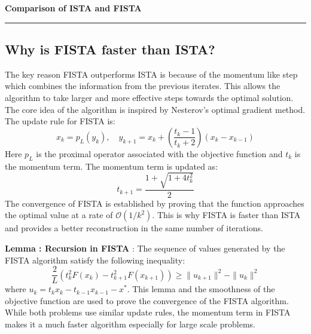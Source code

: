 \documentclass[a4paper,12pt]{article}
\newenvironment{solution}[2][]{%
    \begin{mdframed}[linecolor=blue!70!black, linewidth=2pt, roundcorner=10pt, backgroundcolor=yellow!10!white, skipabove=12pt, skipbelow=12pt]%
        \textbf{\large #2}
        \par\noindent\rule{\textwidth}{0.4pt}
}{
    \end{mdframed}
}
\begin{document}
\begin{solution}{Comparison of ISTA and FISTA}
  \subsection{Why is FISTA faster than ISTA?}
  The key reason FISTA outperforms ISTA is because of the momentum like step which combines the information from the previous iterates. This allows the algorithm to take larger and more effective steps towards the optimal solution. The core idea of the algorithm is inspired by Nesterov's optimal gradient method. The update rule for FISTA is:
  \begin{equation}
    x_k = p_L(y_k), \quad y_{k + 1} = x_k + \left( \displaystyle\frac{t_k - 1}{t_k + 2}\right) (x_k - x_{k-1})
  \end{equation}
  \noindent Here $p_L$ is the proximal operator associated with the objective function and $t_k$ is the momentum term. The momentum term is updated as:
  \begin{equation}
    t_{k+1} = \displaystyle\frac{1 + \sqrt{1 + 4t_k^2}}{2}
  \end{equation}
  \noindent The convergence of FISTA is established by proving that the function approaches the optimal value at a rate of $\mathcal{O}(1/k^2)$. This is why FISTA is faster than ISTA and provides a better reconstruction in the same number of iterations.

  \noindent \textbf{Lemma : Recursion in FISTA} : The sequence of values generated by the FISTA algorithm satisfy the following inequality:
  \begin{equation}
    \frac{2}{L} \left( t_k^2 F(x_k) - t_{k+1}^2 F(x_{k+1}) \right) \geq \| u_{k+1} \|^2 - \| u_k \|^2
  \end{equation}
  \noindent where \( u_k = t_k x_k - t_{k-1} x_{k-1} - x^*\). This lemma and the smoothness of the objective function are used to prove the convergence of the FISTA algorithm. While both problems use similar update rules, the momentum term in FISTA makes it a much faster algorithm especially for large scale problems.
\end{solution}
\end{document}
